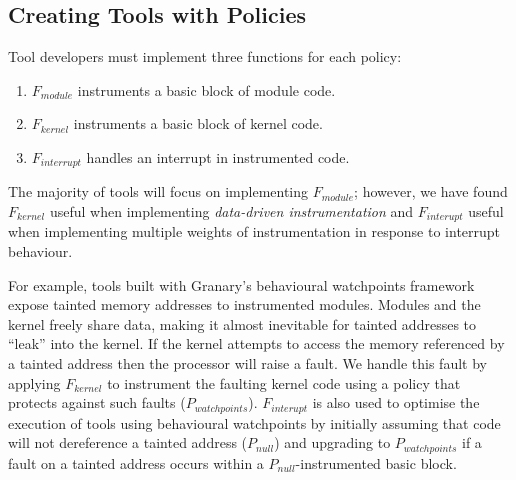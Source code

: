 \documentclass{sigplanconf}
\begin{document}
\subsection{Creating Tools with Policies}

Tool developers must implement three functions for each policy: \begin{enumerate}
	\item $F_{module}$ instruments a basic block of module code.
	\item $F_{kernel}$ instruments a basic block of kernel code.
	\item $F_{interrupt}$ handles an interrupt in instrumented code.
\end{enumerate}

The majority of tools will focus on implementing $F_{module}$; however, we have found $F_{kernel}$ useful when implementing \emph{data-driven instrumentation} and $F_{interupt}$ useful when implementing multiple weights of instrumentation in response to interrupt behaviour. 


For example, tools built with Granary's behavioural watchpoints framework expose tainted memory addresses to instrumented modules. Modules and the kernel freely share data, making it almost inevitable for  tainted addresses to ``leak'' into the kernel. If the kernel attempts to access the memory referenced by a tainted address then the processor will raise a fault. We handle this fault by applying $F_{kernel}$ to instrument the faulting kernel code using a policy that protects against such faults ($P_{watchpoints}$). $F_{interupt}$ is also used to optimise the execution of tools using behavioural watchpoints by initially assuming that code will not dereference a tainted address ($P_{null}$) and upgrading to $P_{watchpoints}$ if a fault on a tainted address occurs within a $P_{null}$-instrumented basic block.
\end{document}
